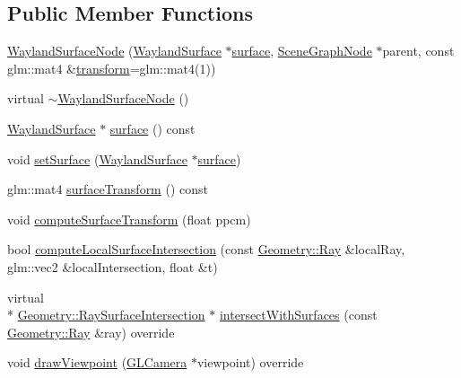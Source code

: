 \subsection*{Public Member Functions}
\begin{DoxyCompactItemize}
\item 
\hyperlink{classmotorcar_1_1WaylandSurfaceNode_ad7d045ae80caac6164e293ba5c7e9307}{Wayland\-Surface\-Node} (\hyperlink{classmotorcar_1_1WaylandSurface}{Wayland\-Surface} $\ast$\hyperlink{classmotorcar_1_1WaylandSurfaceNode_a2f888be4621ed73d815ce006246f50ca}{surface}, \hyperlink{classmotorcar_1_1SceneGraphNode}{Scene\-Graph\-Node} $\ast$parent, const glm\-::mat4 \&\hyperlink{classmotorcar_1_1SceneGraphNode_ad96e79fdd739ac8223a3128003be391a}{transform}=glm\-::mat4(1))
\item 
virtual \hyperlink{classmotorcar_1_1WaylandSurfaceNode_aa5b4593dd0f4834a4d8e1416f322ac8f}{$\sim$\-Wayland\-Surface\-Node} ()
\item 
\hyperlink{classmotorcar_1_1WaylandSurface}{Wayland\-Surface} $\ast$ \hyperlink{classmotorcar_1_1WaylandSurfaceNode_a2f888be4621ed73d815ce006246f50ca}{surface} () const 
\item 
void \hyperlink{classmotorcar_1_1WaylandSurfaceNode_ae073a9e9f05bd5d62f09d24f9a86a31a}{set\-Surface} (\hyperlink{classmotorcar_1_1WaylandSurface}{Wayland\-Surface} $\ast$\hyperlink{classmotorcar_1_1WaylandSurfaceNode_a2f888be4621ed73d815ce006246f50ca}{surface})
\item 
glm\-::mat4 \hyperlink{classmotorcar_1_1WaylandSurfaceNode_a3910d8ccc764aed402074f21c25a89e8}{surface\-Transform} () const 
\item 
void \hyperlink{classmotorcar_1_1WaylandSurfaceNode_a0dfac06ca2855e41613b6e663c76c97e}{compute\-Surface\-Transform} (float ppcm)
\item 
bool \hyperlink{classmotorcar_1_1WaylandSurfaceNode_a7830bc430977685b9d22732171f30dcf}{compute\-Local\-Surface\-Intersection} (const \hyperlink{structmotorcar_1_1Geometry_1_1Ray}{Geometry\-::\-Ray} \&local\-Ray, glm\-::vec2 \&local\-Intersection, float \&t)
\item 
virtual \\*
\hyperlink{structmotorcar_1_1Geometry_1_1RaySurfaceIntersection}{Geometry\-::\-Ray\-Surface\-Intersection} $\ast$ \hyperlink{classmotorcar_1_1WaylandSurfaceNode_adf71a714d07bb262405a361504a77ea4}{intersect\-With\-Surfaces} (const \hyperlink{structmotorcar_1_1Geometry_1_1Ray}{Geometry\-::\-Ray} \&ray) override
\item 
void \hyperlink{classmotorcar_1_1WaylandSurfaceNode_a74d79ca15a4d7983a29752fad8db574c}{draw\-Viewpoint} (\hyperlink{classmotorcar_1_1GLCamera}{G\-L\-Camera} $\ast$viewpoint) override
\end{DoxyCompactItemize}
